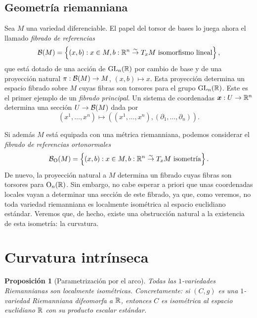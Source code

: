 \documentclass[11pt,a4paper]{amsbook}
\newtheorem{prop}[subsection]{Proposición}
\theoremstyle{remark} \newtheorem{rmk}[subsection]{Observación}
\theoremstyle{definition} \newtheorem{defn}[subsection]{Definición}
\theoremstyle{definition} \newtheorem{ex}[subsection]{Ejemplo}
\theoremstyle{definition} \newtheorem{ej}[subsection]{Ejercicio}
\begin{document}
\subsection{Geometría riemanniana} Sea $M$ una variedad diferenciable. El papel del torsor de bases lo juega ahora el llamado \emph{fibrado de referencias}
\begin{equation*}
\mathcal B(M) = \left\{ (x,b): x\in M, b:\mathbb R^n \overset{\sim}{\rightarrow} T_x M \text{ isomorfismo lineal} \right\},
\end{equation*}
que está dotado de una acción de $\mathrm{GL}_n(\mathbb R)$ por cambio de base y de una proyección natural $\pi:\mathcal B(M)\rightarrow M$, $(x,b)\mapsto x$. Esta proyección determina un espacio fibrado sobre $M$ cuyas fibras son torsores para el grupo $\mathrm{GL}_n(\mathbb R)$. Este es el primer ejemplo de un \emph{fibrado principal}. Un sistema de coordenadas $\bm{x}:U\rightarrow \mathbb R^n$ determina una sección $U\rightarrow \mathcal B(M)$ dada por
\begin{equation*}
(x^1,\dots,x^n) \mapsto \left( (x^1,\dots,x^n), (\partial_1,\dots,\partial_n) \right).
\end{equation*}

Si además $M$ está equipada con una métrica riemanniana, podemos considerar el \emph{fibrado de referencias ortonormales}
\begin{equation*}
\mathcal B_{\mathrm{O}}(M) = \left\{ (x,b): x\in M, b:\mathbb R^n \overset{\sim}{\rightarrow} T_x M \text{ isometría} \right\}.
\end{equation*}
De nuevo, la proyección natural a $M$ determina un fibrado cuyas fibras son torsores para $\mathrm{O}_n(\mathbb R)$. Sin embargo, no cabe esperar a priori que unas coordenadas locales vayan a determinar una sección de este fibrado, ya que, como veremos, no toda variedad riemanniana es localmente isométrica al espacio euclidiano estándar. Veremos que, de hecho, existe una obstrucción natural a la existencia de esta isometría: la curvatura.

\section{Curvatura intrínseca}

\begin{prop}[Parametrización por el arco]
Todas las $1$-variedades Riemannianas son localmente isométricas. Concretamente: si $(C,g)$ es una $1$-variedad Riemanniana difeomorfa a $\mathbb R$, entonces $C$ es isométrica al espacio euclidiano $\mathbb R$ con su producto escalar estándar.
\end{prop}
\end{document}
